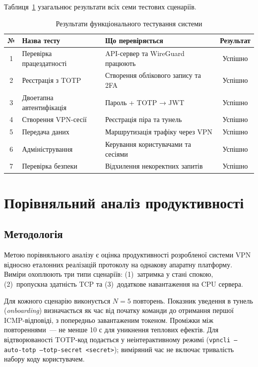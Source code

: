 Таблиця~\ref{tab:functional_tests} узагальнює результати всіх семи
тестових сценаріїв.

\begin{table}[htbp]
\caption{Результати функціонального тестування системи}
\label{tab:functional_tests}
\begin{tabularx}{\textwidth}{|c|X|X|c|}
\hline
\textbf{№} & \textbf{Назва тесту} & \textbf{Що перевіряється} & \textbf{Результат} \\
\hline
1 & Перевірка працездатності & API-сервер та WireGuard працюють & Успішно \\
\hline
2 & Реєстрація з TOTP & Створення облікового запису та 2FA & Успішно \\
\hline
3 & Двоетапна автентифікація & Пароль + TOTP → JWT & Успішно \\
\hline
4 & Створення VPN-сесії & Реєстрація піра та тунель & Успішно \\
\hline
5 & Передача даних & Маршрутизація трафіку через VPN & Успішно \\
\hline
6 & Адміністрування & Керування користувачами та сесіями & Успішно \\
\hline
7 & Перевірка безпеки & Відхилення некоректних запитів & Успішно \\
\hline
\end{tabularx}
\end{table}

\section{Порівняльний аналіз продуктивності}
\label{sec:perf}

\subsection{Методологія}
\label{subsec:perf_methodology}

Метою порівняльного аналізу є оцінка продуктивності розробленої системи VPN
відносно еталонних реалізацій протоколу на однакову апаратну платформу.
Виміри охоплюють три типи сценаріїв: (1)~затримка у стані спокою,
(2)~пропускна здатність TCP та (3)~додаткове навантаження на CPU сервера.

Для кожного сценарію виконується $N=5$ повторень. Показник уведення в
тунель (\textit{onboarding}) визначається як час від початку команди до
отримання першої ICMP-відповіді, з попередньо завантаженим токеном.
Проміжки між повтореннями~--- не менше 10 с для уникнення теплових ефектів.
Для відтворюваності TOTP-код подається у неінтерактивному режимі
(\texttt{vpncli --auto-totp --totp-secret <secret>}); виміряний час не
включає тривалість набору коду користувачем.


